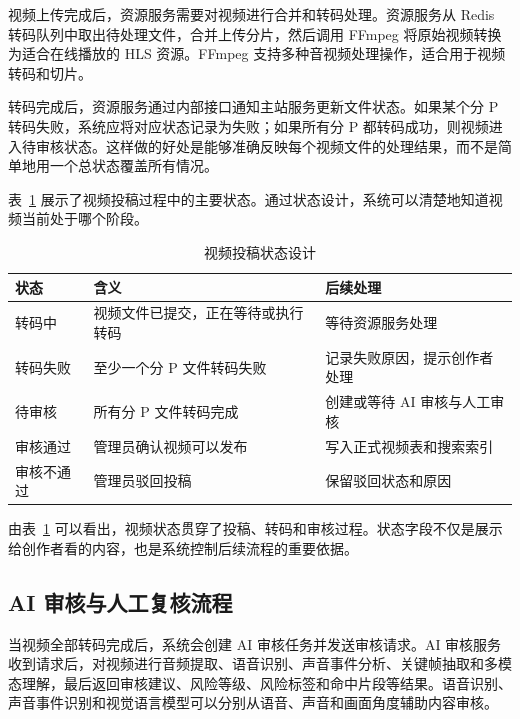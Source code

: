 视频上传完成后，资源服务需要对视频进行合并和转码处理。资源服务从 Redis 转码队列中取出待处理文件，合并上传分片，然后调用 FFmpeg 将原始视频转换为适合在线播放的 HLS 资源。FFmpeg 支持多种音视频处理操作，适合用于视频转码和切片\cite{ffmpegdocs}。

转码完成后，资源服务通过内部接口通知主站服务更新文件状态。如果某个分 P 转码失败，系统应将对应状态记录为失败；如果所有分 P 都转码成功，则视频进入待审核状态。这样做的好处是能够准确反映每个视频文件的处理结果，而不是简单地用一个总状态覆盖所有情况。

表~\ref{tab:video-status-design} 展示了视频投稿过程中的主要状态。通过状态设计，系统可以清楚地知道视频当前处于哪个阶段。

\begin{table}[htbp]
  \centering
  \caption{视频投稿状态设计}
  \label{tab:video-status-design}
  \begin{tabular}{p{}p{}p{}}
    \hline
    \textbf{状态} & \textbf{含义} & \textbf{后续处理} \\
    \hline
    转码中 & 视频文件已提交，正在等待或执行转码 & 等待资源服务处理 \\
    转码失败 & 至少一个分 P 文件转码失败 & 记录失败原因，提示创作者处理 \\
    待审核 & 所有分 P 文件转码完成 & 创建或等待 AI 审核与人工审核 \\
    审核通过 & 管理员确认视频可以发布 & 写入正式视频表和搜索索引 \\
    审核不通过 & 管理员驳回投稿 & 保留驳回状态和原因 \\
    \hline
  \end{tabular}
\end{table}

由表~\ref{tab:video-status-design} 可以看出，视频状态贯穿了投稿、转码和审核过程。状态字段不仅是展示给创作者看的内容，也是系统控制后续流程的重要依据。

\subsection{AI 审核与人工复核流程}
\label{subsec:ai-manual-audit-process}

当视频全部转码完成后，系统会创建 AI 审核任务并发送审核请求。AI 审核服务收到请求后，对视频进行音频提取、语音识别、声音事件分析、关键帧抽取和多模态理解，最后返回审核建议、风险等级、风险标签和命中片段等结果。语音识别、声音事件识别和视觉语言模型可以分别从语音、声音和画面角度辅助内容审核\cite{radford2023whisper}。

